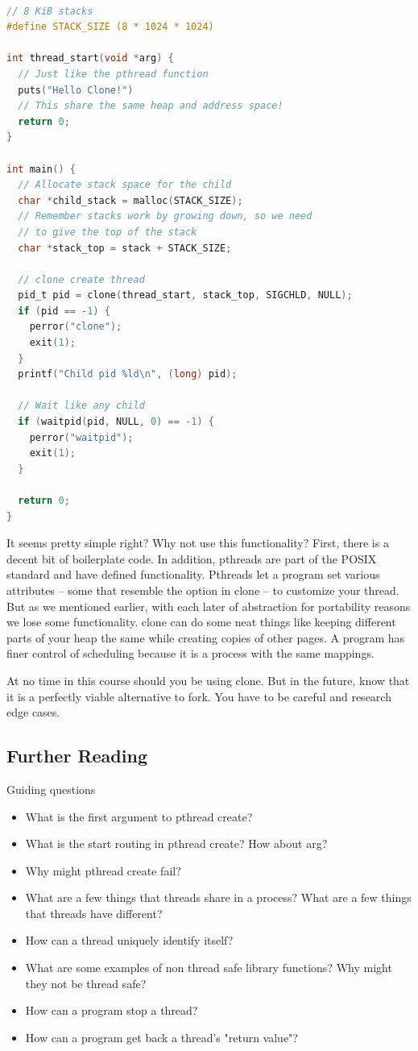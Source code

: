 \begin{lstlisting}[language=C]

// 8 KiB stacks
#define STACK_SIZE (8 * 1024 * 1024)

int thread_start(void *arg) {
  // Just like the pthread function
  puts("Hello Clone!")
  // This share the same heap and address space!
  return 0;
}

int main() {
  // Allocate stack space for the child
  char *child_stack = malloc(STACK_SIZE);
  // Remember stacks work by growing down, so we need
  // to give the top of the stack
  char *stack_top = stack + STACK_SIZE;

  // clone create thread
  pid_t pid = clone(thread_start, stack_top, SIGCHLD, NULL);
  if (pid == -1) {
    perror("clone");
    exit(1);
  }
  printf("Child pid %ld\n", (long) pid);

  // Wait like any child
  if (waitpid(pid, NULL, 0) == -1) {
    perror("waitpid");
    exit(1);
  }

  return 0;
}
\end{lstlisting}

It seems pretty simple right?
Why not use this functionality?
First, there is a decent bit of boilerplate code.
In addition, pthreads are part of the POSIX standard and have defined functionality.
Pthreads let a program set various attributes -- some that resemble the option in clone -- to customize your thread.
But as we mentioned earlier, with each later of abstraction for portability reasons we lose some functionality.
clone can do some neat things like keeping different parts of your heap the same while creating copies of other pages.
A program has finer control of scheduling because it is a process with the same mappings.

At no time in this course should you be using clone.
But in the future, know that it is a perfectly viable alternative to fork.
You have to be careful and research edge cases.

\subsection{Further Reading}

Guiding questions

\begin{itemize}
\item What is the first argument to pthread create?
\item What is the start routing in pthread create? How about arg?
\item Why might pthread create fail?
\item What are a few things that threads share in a process? What are a few things that threads have different?
\item How can a thread uniquely identify itself?
\item What are some examples of non thread safe library functions? Why might they not be thread safe?
\item How can a program stop a thread?
\item How can a program get back a thread's "return value"?
\end{itemize}

